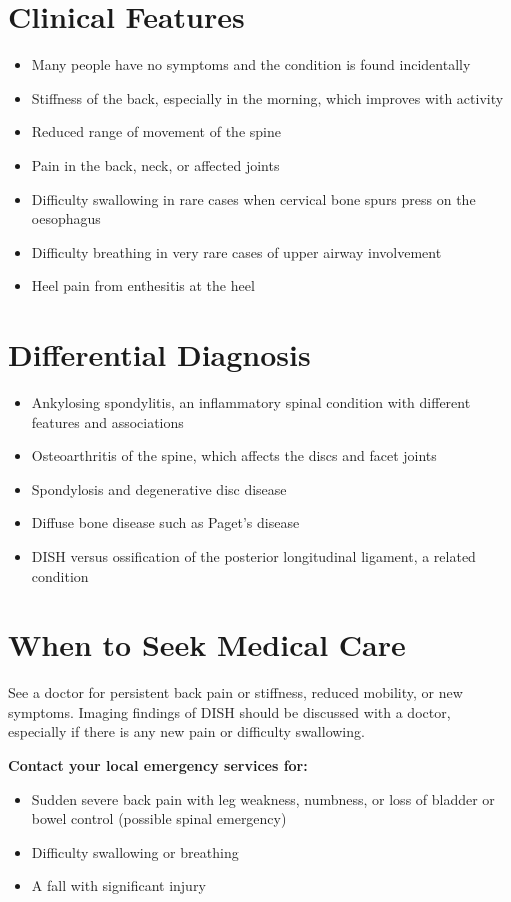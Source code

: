 \section*{Clinical Features}
\begin{itemize}
    \item Many people have no symptoms and the condition is found incidentally
    \item Stiffness of the back, especially in the morning, which improves with activity
    \item Reduced range of movement of the spine
    \item Pain in the back, neck, or affected joints
    \item Difficulty swallowing in rare cases when cervical bone spurs press on the oesophagus
    \item Difficulty breathing in very rare cases of upper airway involvement
    \item Heel pain from enthesitis at the heel
\end{itemize}

\section*{Differential Diagnosis}
\begin{itemize}
    \item Ankylosing spondylitis, an inflammatory spinal condition with different features and associations
    \item Osteoarthritis of the spine, which affects the discs and facet joints
    \item Spondylosis and degenerative disc disease
    \item Diffuse bone disease such as Paget's disease
    \item DISH versus ossification of the posterior longitudinal ligament, a related condition
\end{itemize}

\section*{When to Seek Medical Care}
See a doctor for persistent back pain or stiffness, reduced mobility, or new symptoms. Imaging findings of DISH should be discussed with a doctor, especially if there is any new pain or difficulty swallowing.

\textbf{Contact your local emergency services for:}
\begin{itemize}
    \item Sudden severe back pain with leg weakness, numbness, or loss of bladder or bowel control (possible spinal emergency)
    \item Difficulty swallowing or breathing
    \item A fall with significant injury
\end{itemize}

